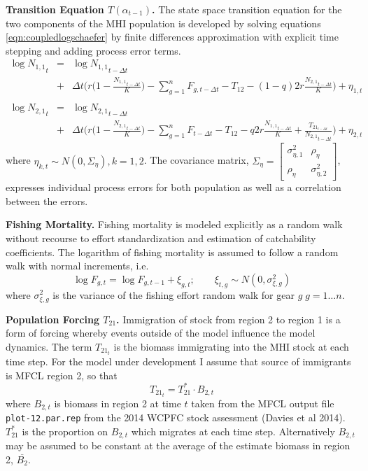 \documentclass[12pt,letterpaper]{article}
\newcommand\widebar[1]{\overline{#1}}
\newcommand\None{{N_{1,1}}}
\newcommand\Ntwo{{N_{2,1}}}
\begin{document}
{\bf Transition Equation $T(\alpha_{t-1})$.}
The state space transition equation for the two components of the MHI
population is developed by solving
equations \ref{eqn:coupledlogschaefer} by finite differences
approximation with explicit time stepping and adding process error
terms.
\begin{eqnarray}
\log \None_t &=& \log \None_{t-\Delta t}\nonumber\\ 
             &+&\Delta t\bigg(r\Big(1-\frac{\None_{t-\Delta t}}{K}\Big)
-\sum_{g=1}^n F_{g,t-\Delta t} - T_{12} - (1-q)2r\frac{\Ntwo_{t-\Delta
t}}{K}\bigg)+\eta_{1,t}\nonumber\\
\\ \log \Ntwo_t &=& \log \Ntwo_{t-\Delta t}\nonumber\\
             &+&\Delta t\bigg(r\Big(1-\frac{\Ntwo_{t-\Delta t}}{K}\Big)
-\sum_{g=1}^n F_{t-\Delta t} - T_{12} - q2r\frac{\None_{t-\Delta t}}{K}
     +\frac{T_{{21}_{t-\Delta t}}}{\Ntwo_{t-\Delta t}}\bigg)+\eta_{2,t}\nonumber
\label{eqn:finitecoupledlogschaefer}
\end{eqnarray}
where $\eta_{k,t} \sim N(0,\Sigma_\eta),k=1,2$. The covariance matrix,
$\Sigma_\eta = \left[\begin{array}{cc}\sigma^2_{\eta,1}&\rho_\eta\\
                                     \rho_\eta&\sigma^2_{\eta,2}
\end{array}\right]$,
expresses individual process errors for both population as well as a
correlation between the errors.

{\bf Fishing Mortality.}
Fishing mortality is
modeled explicitly as a random walk
without recourse to effort standardization and
estimation of catchability coefficients. The logarithm of fishing
mortality is assumed to
follow a random walk with normal increments, i.e.
\begin{equation}
\log F_{g,t} = \log F_{g,t-1} + \xi_{g,t};\qquad \xi_{t,g}\sim
N(0,\sigma^2_{\xi,g}) \label{eqn:Fwalk}
\end{equation}
where  $\sigma^2_{\xi,g}$ is the variance of the fishing
effort random walk for gear $g\;g=1\ldots n$.

{\bf Population Forcing $T_{21}$.}
Immigration of stock from region 2 to region 1 is a
form of forcing whereby events outside of the model influence the
model dynamics. The term $T_{{21}_t}$ is the biomass immigrating
into the MHI stock at each time step. For the model under development
I assume that source of immigrants is MFCL region 2, so that
\begin{equation}
T_{{21}_t} = T^*_{21}\cdot B_{2,t}
\end{equation}
where $B_{2,t}$ is biomass in region 2 at time $t$ taken from the MFCL output file
{\tt plot-12.par.rep} from the 2014 WCPFC stock assessment
(Davies et al 2014). $T^*_{21}$ is the proportion on
$B_{2,t}$ which migrates at each time step.
Alternatively $B_{2,t}$ may be assumed to be constant at the average
of the estimate biomass in region 2, $\widebar{B_{2}}$.
\end{document}
